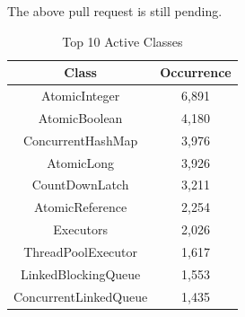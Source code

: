 The above pull request is still pending.
\begin{table}
	\centering
	\caption{Top 10 Active Classes}
	\label{table:topapi}
	\begin{tabular}{|c|c|}\hline
		Class&Occurrence\\\hline
		AtomicInteger&6,891\\
		AtomicBoolean&4,180\\
		ConcurrentHashMap&3,976\\
		AtomicLong&3,926\\
		CountDownLatch&3,211\\
		AtomicReference&2,254\\
		Executors&2,026\\
		ThreadPoolExecutor&1,617\\
		LinkedBlockingQueue&1,553\\
		ConcurrentLinkedQueue&1,435\\\hline
	\end{tabular}
\end{table}

